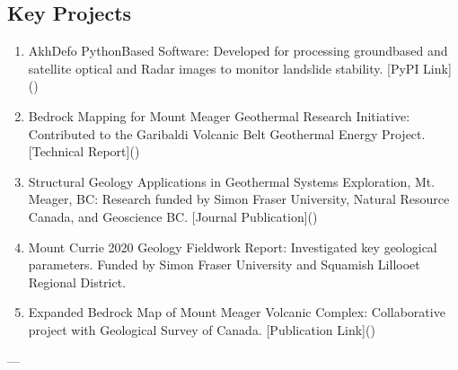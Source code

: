 \documentclass[letterpaper,10pt,english]{sphinxmanual}
\begin{document}
\subsection{Key Projects}
\label{\detokenize{CV_Mahmud_2023:key-projects}}\begin{enumerate}
%
\item {} 
\sphinxAtStartPar
AkhDefo Python\sphinxhyphen{}Based Software: Developed for processing ground\sphinxhyphen{}based and satellite optical and Radar images to monitor landslide stability. {[}PyPI Link{]}()

\item {} 
\sphinxAtStartPar
Bedrock Mapping for Mount Meager Geothermal Research Initiative: Contributed to the Garibaldi Volcanic Belt Geothermal Energy Project. {[}Technical Report{]}()

\item {} 
\sphinxAtStartPar
Structural Geology Applications in Geothermal Systems Exploration, Mt. Meager, BC: Research funded by Simon Fraser University, Natural Resource Canada, and Geoscience BC. {[}Journal Publication{]}()

\item {} 
\sphinxAtStartPar
Mount Currie 2020 Geology Fieldwork Report: Investigated key geological parameters. Funded by Simon Fraser University and Squamish Lillooet Regional District.

\item {} 
\sphinxAtStartPar
Expanded Bedrock Map of Mount Meager Volcanic Complex: Collaborative project with Geological Survey of Canada. {[}Publication Link{]}()

\end{enumerate}

\sphinxAtStartPar
—
\end{document}
